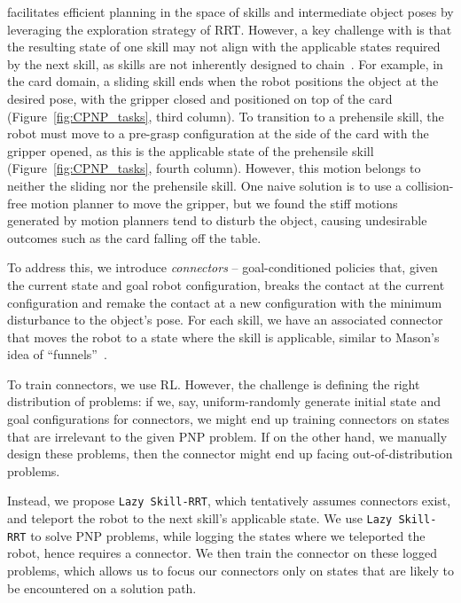 \skillrrt{} facilitates efficient planning in the space of skills and intermediate object poses by leveraging the exploration strategy of RRT. However, a key challenge with \skillrrt{} is that the resulting state of one skill may not align with the applicable states required by the next skill, as skills are not inherently designed to chain~\cite{konidaris2009skill}. For example, in the card domain, a sliding skill ends when the robot positions the object at the desired pose, with the gripper closed and positioned on top of the card (Figure~\ref{fig:CPNP_tasks}, third column). To transition to a prehensile skill, the robot must move to a pre-grasp configuration at the side of the card with the gripper opened, as this is the applicable state of the prehensile skill (Figure~\ref{fig:CPNP_tasks}, fourth column). However, this motion belongs to neither the sliding nor the prehensile skill. One naive solution is to use a collision-free motion planner to move the gripper, but we found the stiff motions generated by motion planners tend to disturb the object, causing undesirable outcomes such as the card falling off the table.

To address this, we introduce \textit{connectors} -- goal-conditioned policies that, given the current state and goal robot configuration, breaks the contact at the current configuration and remake the contact at a new configuration with the minimum disturbance to the object’s pose. For each skill, we have an associated connector that moves the robot to a state where the skill is applicable, similar to Mason's idea of ``funnels''~\cite{mason1985mechanics}. 

To train connectors, we use RL. However, the challenge is defining the right distribution of problems: if we, say, uniform-randomly generate initial state and goal configurations for connectors, we might end up training connectors on states that are irrelevant to the given PNP problem. If on the other hand, we manually design these problems, then the connector might end up facing out-of-distribution problems.

Instead, we propose \texttt{Lazy Skill-RRT}, which tentatively assumes connectors exist, and teleport the robot to the next skill's applicable state. We use \texttt{Lazy Skill-RRT} to solve PNP problems, while logging the states where we teleported the robot, hence requires a connector. We then train the connector on these logged problems, which allows us to focus our connectors only on states that are likely to be encountered on a solution path.


